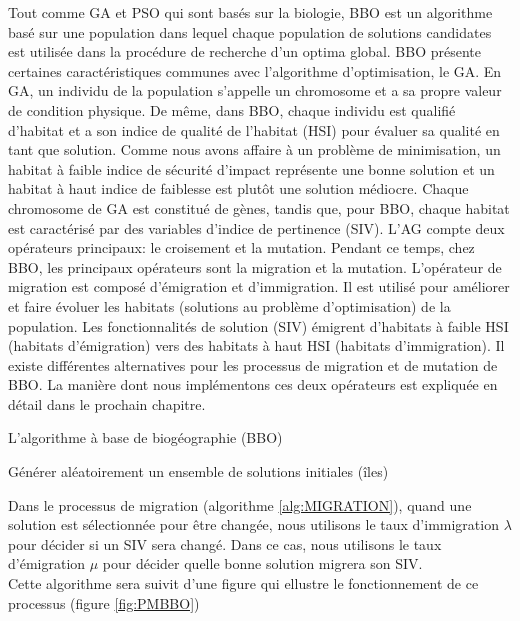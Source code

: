 \begin{enumerate}[label=\alph*)]
Tout comme GA et PSO qui sont basés sur la biologie, BBO est un algorithme basé sur une population dans lequel chaque population de solutions candidates est utilisée dans la procédure de recherche d’un optima global. BBO présente certaines caractéristiques communes avec l’algorithme d'optimisation, le GA. En GA, un individu de la population s'appelle un chromosome et a sa propre valeur de condition physique. De même, dans BBO, chaque individu est qualifié d'habitat et a son indice de qualité de l'habitat (HSI) pour évaluer sa qualité en tant que solution. Comme nous avons affaire à un problème de minimisation, un habitat à faible indice de sécurité d'impact représente une bonne solution et un habitat à haut indice de faiblesse est plutôt une solution médiocre. Chaque chromosome de GA est constitué de gènes, tandis que, pour BBO, chaque habitat est caractérisé par des variables d'indice de pertinence (SIV). L'AG compte deux opérateurs principaux: le croisement et la mutation. Pendant ce temps, chez BBO, les principaux opérateurs sont la migration et la mutation. L'opérateur de migration est composé d'émigration et d'immigration. Il est utilisé pour améliorer et faire évoluer les habitats (solutions au problème d'optimisation) de la population. Les fonctionnalités de solution (SIV) émigrent d'habitats à faible HSI (habitats d'émigration) vers des habitats à haut HSI (habitats d'immigration). Il existe différentes alternatives pour les processus de migration et de mutation de BBO. La manière dont nous implémentons ces deux opérateurs est expliquée en détail dans le prochain chapitre. \\


\begin{algorithm}[H]
\caption{L’algorithme à base de biogéographie (BBO)}
\SetAlgoLined
\DontPrintSemicolon

Générer aléatoirement un ensemble de solutions initiales (îles) \;

\end{algorithm}

Dans le processus de migration (algorithme \ref{alg:MIGRATION}), quand une solution est sélectionnée pour être changée, nous utilisons le taux d'immigration $\lambda$ pour décider si un SIV sera changé. Dans ce cas, nous utilisons le taux d'émigration $\mu$ pour décider quelle bonne solution migrera son SIV.\\
Cette algorithme  sera suivit d’une figure qui ellustre le fonctionnement de ce processus (figure \ref{fig:PMBBO}) \\


\end{enumerate}
